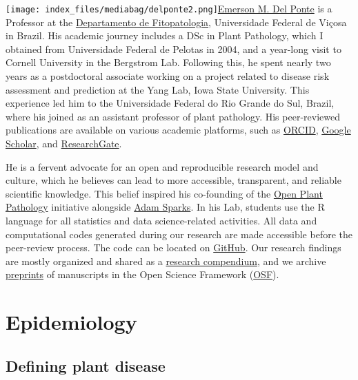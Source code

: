 \documentclass[
  letterpaper,
  DIV=11,
  numbers=noendperiod]{scrreprt}
\begin{document}
\texttt{[image: index\_files/mediabag/delponte2.png]}\href{https://emersondelponte.netlify.app/}{Emerson
M. Del Ponte} is a Professor at the
\href{http://www.dfp.ufv.br/graduate/faculty/}{Departamento de
Fitopatologia}, Universidade Federal de Viçosa in Brazil. His academic
journey includes a DSc in Plant Pathology, which I obtained from
Universidade Federal de Pelotas in 2004, and a year-long visit to
Cornell University in the Bergstrom Lab. Following this, he spent nearly
two years as a postdoctoral associate working on a project related to
disease risk assessment and prediction at the Yang Lab, Iowa State
University. This experience led him to the Universidade Federal do Rio
Grande do Sul, Brazil, where his joined as an assistant professor of
plant pathology. His peer-reviewed publications are available on various
academic platforms, such as
\href{https://orcid.org/0000-0003-4398-409X}{ORCID},
\href{https://scholar.google.com.br/citations?user=LgNDabAAAAAJ\&hl=en}{Google
Scholar}, and
\href{https://www.researchgate.net/profile/Emerson-Del-Ponte/research}{ResearchGate}.

He is a fervent advocate for an open and reproducible research model and
culture, which he believes can lead to more accessible, transparent, and
reliable scientific knowledge. This belief inspired his co-founding of
the \href{http://www.openplantpathology.org/}{Open Plant Pathology}
initiative alongside \href{http://adamhsparks.netlify.app/}{Adam
Sparks}. In his Lab, students use the R language for all statistics and
data science-related activities. All data and computational codes
generated during our research are made accessible before the peer-review
process. The code can be located on
\href{https://github.com/emdelponte}{GitHub}. Our research findings are
mostly organized and shared as a
\href{https://research-compendium.science/}{research compendium}, and we
archive
\href{https://publicationethics.org/resources/discussion-documents/preprints}{preprints}
of manuscripts in the Open Science Framework
(\href{https://osf.io/jb6yd}{OSF}).


\hypertarget{epidemiology}{%
\chapter{Epidemiology}\label{epidemiology}}

\hypertarget{defining-plant-disease}{%
\section{Defining plant disease}\label{defining-plant-disease}}
\end{document}
